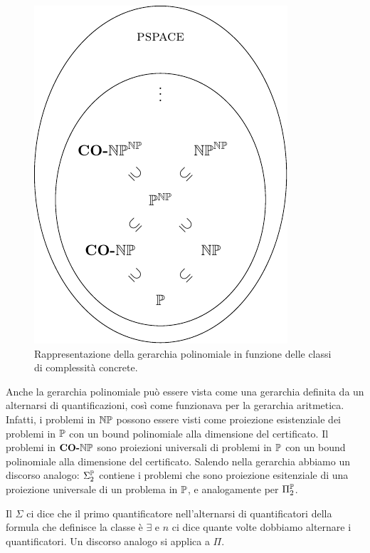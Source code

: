 \begin{figure}[h]
    \begin{center}
        \includegraphics{./img/oracles/PolyHierarchy2.pdf}
        \caption{Rappresentazione della gerarchia polinomiale in funzione delle classi di
        complessità concrete.}
        \label{img:PolyHierarchy2}
    \end{center}
\end{figure}


Anche la gerarchia polinomiale può essere vista come una gerarchia definita da un alternarsi di
quantificazioni, così come funzionava per la gerarchia aritmetica. Infatti, i problemi in
$\mathbb{NP}$ possono essere visti come proiezione esistenziale dei problemi in $\mathbb{P}$ con un bound
polinomiale alla dimensione del certificato. Il problemi in $\textbf{CO-}\mathbb{NP}$ sono proiezioni universali di
problemi in $\mathbb{P}$ con un bound polinomiale alla dimensione del certificato. Salendo nella
gerarchia abbiamo un discorso analogo: $\Sigma_{2}^{\mathbb{P}}$ contiene i problemi che sono
proiezione esitenziale di una proiezione universale di un problema in $\mathbb{P}$, e analogamente per
$\Pi_{2}^{\mathbb{P}}$. 

Il $\Sigma$ ci dice che il primo quantificatore nell'alternarsi di quantificatori della formula che
definisce la classe è $\exists$ e $n$ ci dice quante volte dobbiamo alternare i quantificatori. Un
discorso analogo si applica a $\Pi$.
